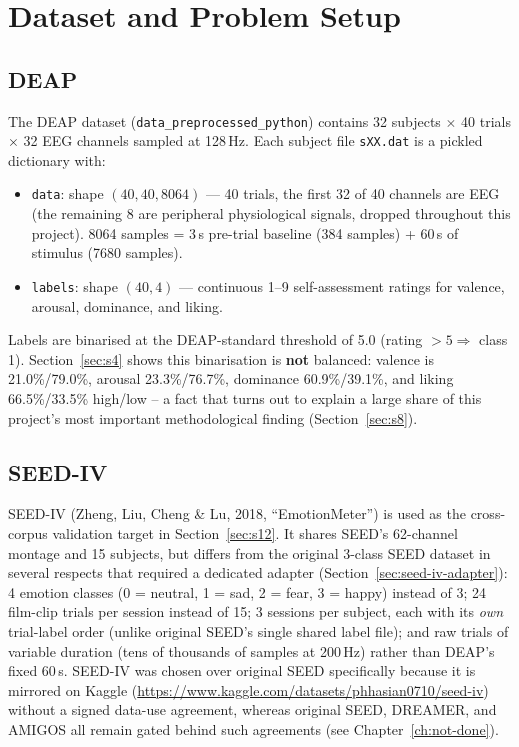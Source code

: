 \documentclass[11pt]{report}
\begin{document}
\chapter{Dataset and Problem Setup}
\label{ch:dataset}

\section{DEAP}
The DEAP dataset (\texttt{data\_preprocessed\_python}) contains 32 subjects
$\times$ 40 trials $\times$ 32 EEG channels sampled at 128\,Hz. Each subject
file \texttt{sXX.dat} is a pickled dictionary with:
\begin{itemize}
  \item \texttt{data}: shape $(40, 40, 8064)$ --- 40 trials, the first 32 of
        40 channels are EEG (the remaining 8 are peripheral physiological
        signals, dropped throughout this project). 8064 samples = 3\,s
        pre-trial baseline (384 samples) + 60\,s of stimulus (7680 samples).
  \item \texttt{labels}: shape $(40, 4)$ --- continuous 1--9 self-assessment
        ratings for valence, arousal, dominance, and liking.
\end{itemize}
Labels are binarised at the DEAP-standard threshold of 5.0 (rating $>5 \Rightarrow$
class 1). Section~\ref{sec:s4} shows this binarisation is \textbf{not}
balanced: valence is 21.0\%/79.0\%, arousal 23.3\%/76.7\%, dominance
60.9\%/39.1\%, and liking 66.5\%/33.5\% high/low -- a fact that turns out to
explain a large share of this project's most important methodological
finding (Section~\ref{sec:s8}).

\section{SEED-IV}
SEED-IV (Zheng, Liu, Cheng \& Lu, 2018, ``EmotionMeter'') is used as the
cross-corpus validation target in Section~\ref{sec:s12}. It shares SEED's
62-channel montage and 15 subjects, but differs from the original 3-class
SEED dataset in several respects that required a dedicated adapter
(Section~\ref{sec:seed-iv-adapter}): 4 emotion classes (0 = neutral,
1 = sad, 2 = fear, 3 = happy) instead of 3; 24 film-clip trials per session
instead of 15; 3 sessions per subject, each with its \emph{own} trial-label
order (unlike original SEED's single shared label file); and raw trials of
variable duration (tens of thousands of samples at 200\,Hz) rather than
DEAP's fixed 60\,s. SEED-IV was chosen over original SEED specifically
because it is mirrored on Kaggle
(\url{https://www.kaggle.com/datasets/phhasian0710/seed-iv}) without a
signed data-use agreement, whereas original SEED, DREAMER, and AMIGOS all
remain gated behind such agreements (see Chapter~\ref{ch:not-done}).
\end{document}
